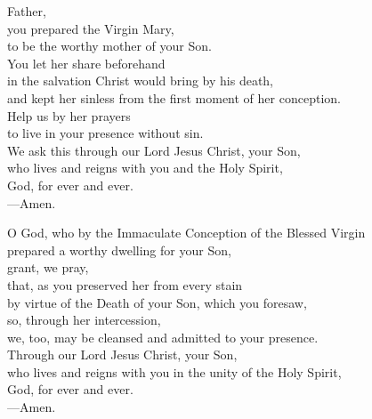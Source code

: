 \prayer


\begin{prayerverse}
Father,\\
you prepared the Virgin Mary,\\
to be the worthy mother of your Son.\\
You let her share beforehand\\
in the salvation Christ would bring by his death,\\
and kept her sinless from the first moment of her conception.\\
Help us by her prayers\\
to live in your presence without sin.\\
We ask this through our Lord Jesus Christ, your Son,\\
who lives and reigns with you and the Holy Spirit,\\
God, for ever and ever.\\
{\color{red}---\thinspace}Amen.
\end{prayerverse}


\begin{prayerverse}
O God, who by the Immaculate Conception of the Blessed Virgin\\
prepared a worthy dwelling for your Son,\\
grant, we pray,\\
that, as you preserved her from every stain\\
by virtue of the Death of your Son, which you foresaw,\\
so, through her intercession,\\
we, too, may be cleansed and admitted to your presence.\\
Through our Lord Jesus Christ, your Son,\\
who lives and reigns with you in the unity of the Holy Spirit,\\
God, for ever and ever.\\
{\color{red}---\thinspace}Amen.
\end{prayerverse}

